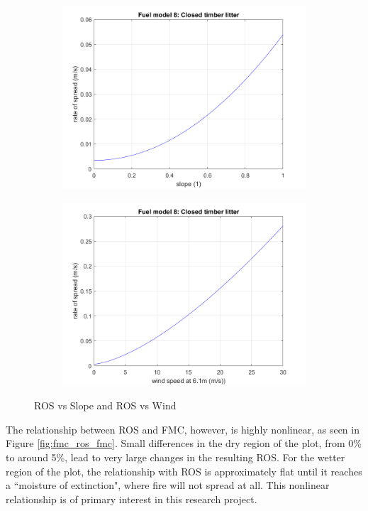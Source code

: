 \documentclass[11pt]{article}%
\begin{document}
\begin{figure}[ht]
    \centering
    \begin{subfigure}{0.45\textwidth}
        \centering
        \includegraphics[width=\linewidth]{images/fuel8_ros_slope.png}
    \end{subfigure}
    \hfill
    \begin{subfigure}{0.45\textwidth}
        \centering
        \includegraphics[width=\linewidth]{images/fuel8_ros_wind.png}
    \end{subfigure}
    \caption{ROS vs Slope and ROS vs Wind}
    \label{fig:ros_other}
\end{figure}


The relationship between ROS and FMC, however, is highly nonlinear, as seen in Figure \ref{fig:fmc_ros_fmc}. Small differences in the dry region of the plot, from 0\% to around 5\%, lead to very large changes in the resulting ROS. For the wetter region of the plot, the relationship with ROS is approximately flat until it reaches a ``moisture of extinction", where fire will not spread at all. This nonlinear relationship is of primary interest in this research project. 
\end{document}
